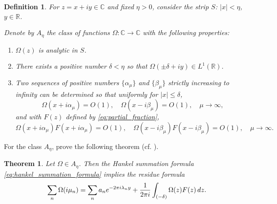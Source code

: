 \documentclass{article}
\newtheorem{definition}{Definition}
\newtheorem{theorem}{Theorem}
\begin{document}
\begin{definition}
  \label{def:class_An}For $z = x + iy \in \mathbb{C}$ and fixed $\eta > 0$,
  consider the strip $S$: $|x| < \eta$, $y \in \mathbb{R}$.
  
  Denote by $A_{\eta}$ the class of functions $\Omega : \mathbb{C} \to
  \mathbb{C}$ with the following properties:
  \begin{enumerate}
    \item $\Omega (z)$ is analytic in $S$.
    
    \item There exists a positive number $\delta < \eta$ so that $\Omega (\pm
    \delta + iy) \in L^1 (\mathbb{R})$.
    
    \item Two sequences of positive numbers $\{\alpha_{\mu} \}$ and
    $\{\beta_{\mu} \}$ strictly increasing to infinity can be determined so
    that uniformly for $|x| \leq \delta$,
    \begin{equation}
      \Omega (x + i \alpha_{\mu}) = O (1), \quad \Omega (x - i \beta_{\mu}) =
      O (1), \quad \mu \to \infty, \label{eq:hankel_class_1}
    \end{equation}
    and with $F (z)$ defined by \eqref{eq:partial_fraction},
    \begin{equation}
      \Omega (x + i \alpha_{\mu}) F (x + i \alpha_{\mu}) = O (1), \quad \Omega
      (x - i \beta_{\mu}) F (x - i \beta_{\mu}) = O (1), \quad \mu \to \infty
      . \label{eq:hankel_class_2}
    \end{equation}
  \end{enumerate}
\end{definition}

For the class $A_{\eta}$, prove the following theorem (cf. {\cite{19}}).

\begin{theorem}
  \label{thm:residue_formula}Let $\Omega \in A_{\eta}$. Then the Hankel
  summation formula \eqref{eq:hankel_summation_formula} implies the residue
  formula
  \begin{equation}
    \sum_n \Omega (i \mu_n) = \sum_n a_n e^{- 2 \pi i \lambda_n y} +
    \frac{1}{2 \pi i}  \int_{(- \delta)} \Omega (z) F (z)  \hspace{0.17em} dz.
    \label{eq:residue_formula_eq}
  \end{equation}
\end{theorem}
\end{document}
